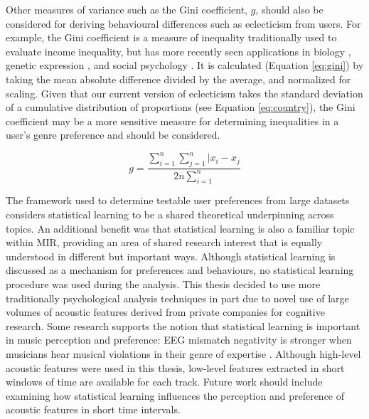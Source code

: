 \documentclass[a4paper]{article}
\begin{document}
Other measures of variance such as the Gini coefficient, $g$, should also be considered for deriving behavioural differences such as eclecticism from users. For example, the Gini coefficient is a measure of inequality traditionally used to evaluate income inequality, but has more recently seen applications in biology \cite{weiner1984meaning}, genetic expression \cite{kirchman2010structure}, and social psychology \cite{kumar2014detecting}. It is calculated (Equation \ref{eq:gini}) by taking the mean absolute difference divided by the average, and normalized for scaling. Given that our current version of eclecticism takes the standard deviation of a cumulative distribution of proportions (see Equation \ref{eq:country}), the Gini coefficient may be a more sensitive measure for determining inequalities in a user's genre preference and should be considered.

\begin{equation}
g = \dfrac{\sum\limits_{i=1}^n \sum\limits_{j=1}^n |x_i-x_j}{2n \sum\limits_{i=1}^n}
\label{eq:gini}
\end{equation}

The framework used to determine testable user preferences from large datasets considers statistical learning to be a shared theoretical underpinning across topics. An additional benefit was that statistical learning is also a familiar topic within MIR, providing an area of shared research interest that is equally understood in different but important ways. Although statistical learning is discussed as a mechanism for preferences and behaviours, no statistical learning procedure was used during the analysis. This thesis decided to use more traditionally psychological analysis techniques in part due to novel use of large volumes of acoustic features derived from private companies for cognitive research. Some research supports the notion that statistical learning is important in music perception and preference: EEG mismatch negativity is stronger when musicians hear musical violations in their genre of expertise \cite{brattico2009neural,Tervaniemi2014}. Although high-level acoustic features were used in this thesis, low-level features extracted in short windows of time are available for each track. Future work should include examining how statistical learning influences the perception and preference of acoustic features in short time intervals.
\end{document}
